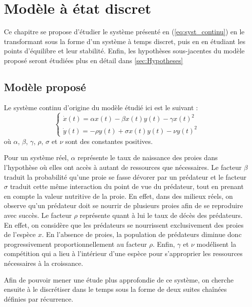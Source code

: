 \chapter{Modèle à état discret}
\label{ch:modele_discret}

Ce chapitre se propose d'étudier le système présenté en (\ref{eq:syst_continu}) en le transformant sous la forme d'un système à temps discret, puis en en étudiant les points d'équilibre et leur stabilité. Enfin, les hypothèses sous-jacentes du modèle proposé seront étudiées plus en détail dans \ref{sec:Hypotheses}

\section{Modèle proposé}
\label{sec:modele_propose}

Le système continu d'origine du modèle étudié ici est le suivant :
\begin{equation}
    \label{eq:syst_continu}
    \begin{cases}
        \dot{x}(t) = \alpha x(t) - \beta x(t) y(t) - \gamma x(t)^2 \\
        \dot{y}(t) = - \rho y(t) + \sigma x(t) y(t) - \nu y(t)^2
    \end{cases}
\end{equation}
où $\alpha$, $\beta$, $\gamma$, $\rho$, $\sigma$ et $\nu$ sont des constantes positives.

Pour un système réel, $\alpha$ représente le taux de naissance des proies dans l'hypothèse où elles ont accès à autant de ressources que nécessaires.
Le facteur $\beta$ traduit la probabilité qu'une proie se fasse dévorer par un prédateur et le facteur $\sigma$ traduit cette même interaction du point de vue du prédateur, tout en prenant en compte la valeur nutritive de la proie. En effet, dans des milieux réels, on observe qu'un prédateur doit se nourrir de plusieurs proies afin de se reproduire avec succès.
Le facteur $\rho$ représente quant à lui le taux de décès des prédateurs. En effet, on considère que les prédateurs se nourrissent exclusivement des proies de l'espèce $x$. En l'absence de proies, la population de prédateurs diminue donc progressivement proportionnellement au facteur $\rho$.
Enfin, $\gamma$ et $\nu$ modélisent la compétition qui a lieu à l'intérieur d'une espèce pour s'approprier les ressources nécessaires à la croissance.

Afin de pouvoir mener une étude plus approfondie de ce système, on cherche ensuite à le discrétiser dans le temps sous la forme de deux suites chaînées définies par récurrence.

